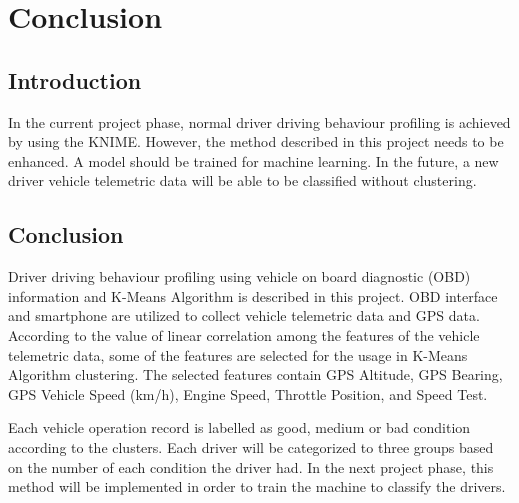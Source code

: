 \chapter{Conclusion}
\section{Introduction}
In the current project phase, normal driver driving behaviour profiling is achieved by using the KNIME. However, the method described in this project needs to be enhanced. A model should be trained for machine learning. In the future, a new driver vehicle telemetric data will be able to be classified without clustering. 

\section{Conclusion}

Driver driving behaviour profiling using vehicle on board diagnostic (OBD) information and K-Means Algorithm is described in this project. OBD interface and smartphone are utilized to collect vehicle telemetric data and GPS data. According to the value of linear correlation among the features of the vehicle telemetric data, some of the features are selected for the usage in K-Means Algorithm clustering. The selected features contain GPS Altitude, GPS Bearing, GPS Vehicle Speed (km/h), Engine Speed, Throttle Position, and Speed Test. 

Each vehicle operation record is labelled as good, medium or bad condition according to the clusters. Each driver will be categorized to three groups based on the number of each condition the driver had. In the next project phase, this method will be implemented in order to train the machine to classify the drivers.
